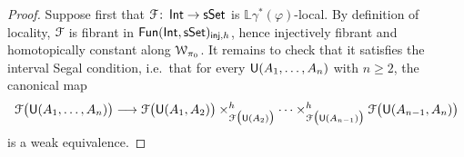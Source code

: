 \begin{proof}
    Suppose first that $\mathcal F\colon \operatorname{\mathsf{Int}} \to \operatorname{\sf sSet}$ is
    $\mathbb{L}\gamma^{*}(\varphi)$-local. By definition of locality, $\mathcal F$ is
    fibrant in $\operatorname{{\sf Fun}}(\operatorname{\mathsf{Int}},\operatorname{\sf sSet})_{\mathsf{inj},h}$, hence injectively fibrant
    and homotopically constant along $\mathcal W_{\pi_0}$. It remains to check that it
    satisfies the interval Segal condition, i.e.\ that for every
    $\mathsf U(A_1,\ldots,A_n)$ with $n\geq 2$, the canonical map
    \begin{equation}\label{eq segal}
        \mathcal F\big(\mathsf U(A_1,\ldots, A_n)\big)
          \longrightarrow
        \mathcal F\big(\mathsf U(A_1,A_2)\big)
          \times^{h}_{\mathcal F\big(\mathsf U(A_2)\big)}
        \cdots
          \times_{\mathcal F\big(\mathsf U(A_{n-1})\big)}^{h}
        \mathcal F\big(\mathsf U(A_{n-1},A_n)\big)
    \end{equation}
    is a weak equivalence.


\end{proof}
